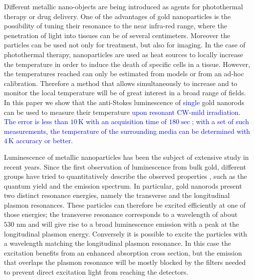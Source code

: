 \documentclass[journal=nalefd,manuscript=letter]{achemso}
\newcommand{\HI}[1]{\textcolor{blue}{#1}} %
\newcommand{\K}{\ensuremath{\,\textrm{K}}}
\newcommand{\nm}{\ensuremath{\,\textrm{nm}}}
\begin{document}
Different metallic nano-objects are being introduced as agents for photothermal
therapy\cite{Huang2006,Huang2008} or drug delivery\cite{Kang2013}. One of the
advantages of gold nanoparticles is the possibility of tuning their resonance to
the near infra-red range, where the penetration of light into tissues can be of
several
centimeters\cite{Huang2006,Gobin2007,Hirsch2003,ONeal2004,Li2013c,Huang2008}.
Moreover the particles can be used not only for treatment, but also for
imaging\cite{Zhao2014a,Huang2006}. In the case of photothermal therapy,
nanoparticles are used as heat sources\cite{Gobin2007,Hirsch2003} to locally
increase the temperature in order to induce the death of specific cells in a
tissue\cite{Huang2008,Huang2006}. However, the temperatures
reached\cite{Donner2013} can only be estimated from models\cite{Zhao2014a} or
from an ad-hoc calibration. Therefore a method that allows simultaneously to
increase and to monitor the local temperature will be of great interest in a
broad range of fields. In this paper we show that the anti-Stokes luminescence
of \HI{single} gold nanorods can be used to measure their temperature 
\HI{upon resonant CW-mild irradiation. The error is less than $10\K$ with an acquisition time of $180\sec$; with a set of such measurements, the temperature of the surrounding media can be determined with $4\K$ accuracy or better.}

Luminescence of metallic nanoparticles has been the subject of extensive study in
recent years. Since the first observation of luminescence from bulk
gold\cite{Mooradian1969}, different groups have tried to quantitatively describe
the observed properties\cite{Mohamed2000,Beversluis2003a} \HI{\cite{Huang2014, hugall2015demonstrating,mertens2017light}}, 
such as the quantum yield\cite{Fang2012,Rao2015,Yorulmaz2012,Cheng2015,Dulkeith2004} and the
emission spectrum\cite{Link2010}. In particular, gold nanorods present two distinct
resonance energies, namely the transverse and the longitudinal plasmon
resonances. These particles can therefore be excited efficiently at one of those
energies; the transverse resonance corresponds to a wavelength of about $530\,\nm$ and will give
rise to a broad luminescence emission with a peak at the longitudinal plasmon energy.
Conversely it is possible to excite the particles with a wavelength matching
the longitudinal plasmon resonance. In this case the excitation benefits from
an enhanced absorption cross section, but the emission that overlaps the plasmon
resonance will be mostly blocked by the filters needed to prevent direct
excitation light from reaching the detectors.
\end{document}
